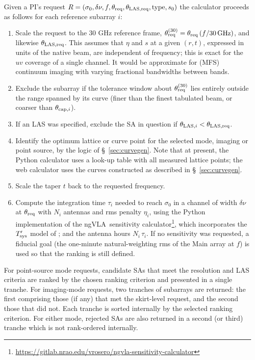 \documentclass[11pt]{article}
\newcommand{\ngvla}{ngVLA}
\begin{document}
Given a PI's request $R = (\sigma_0, \delta\nu, f, \theta_{\rm req},
\theta_{\rm LAS,req}, {\rm type}, s_0)$ the calculator proceeds as
follows for each reference subarray $i$:
\begin{enumerate}
\item Scale the request to the 30 GHz reference frame, $\theta_{\rm
  req}^{(30)} = \theta_{\rm req}\,(f/30\,{\rm GHz})$, and likewise
  $\theta_{\rm LAS,req}$.  This assumes that $\eta$ and $s$ at a given
  $(r,t)$, expressed in units of the native beam, are independent of
  frequency; this is exact for the $uv$ coverage of a single channel.
  It would be approximate for (MFS) continuum imaging with varying
  fractional bandwidths between bands.
\item Exclude the subarray if the tolerance window about
  $\theta_{\rm req}^{(30)}$ lies entirely outside the range spanned by
  its curve (finer than the finest tabulated beam, or coarser than
  $\theta_{{\rm cap},i}$).
\item If an LAS was specified, exclude the SA in question if
  $\theta_{{\rm  LAS},i} < \theta_{\rm LAS,req}$.
\item Identify the optimum lattice or curve point for the selected
  mode, imaging or point source, by the logic of \S~\ref{sec:curvegen}.
  Note that at present, the Python calculator uses a look-up table
  with all measured lattice points; the web calculator uses the
  curves constructed as described in \S~\ref{sec:curvegen}.
\item Scale the taper $t$ back to the requested frequency.
\item Compute the integration time $\tau_i$ needed to reach $\sigma_0$
  in a channel of width $\delta\nu$ at $\theta_{\rm req}$ with $N_i$
  antennas and rms penalty $\eta_i$, using the Python implementation
  of the \ngvla\ sensitivity
  calculator\footnote{\url{https://gitlab.nrao.edu/vrosero/ngvla-sensitivity-calculator}},
  which incorporates the $T'_{\rm sys}$ model of \citep{memo96}; and
  the antenna hours $N_i\,\tau_i$.  If no sensitivity was requested, a
  fiducial goal (the one-minute natural-weighting rms of the Main
  array at $f$) is used so that the ranking is still defined.
\end{enumerate}

For point-source mode requests, candidate SAs that meet the resolution
and LAS criteria are ranked by the chosen ranking criterion and
presented in a single tranche.  For imaging-mode requests, two
tranches of subarrays are returned: the first comprising those (if
any) that met the skirt-level request, and the second those that did
not. Each tranche is sorted internally by the selected ranking
criterion. For either mode, rejected SAs are also returned in a second
(or third) tranche which is not rank-ordered internally.
\end{document}
